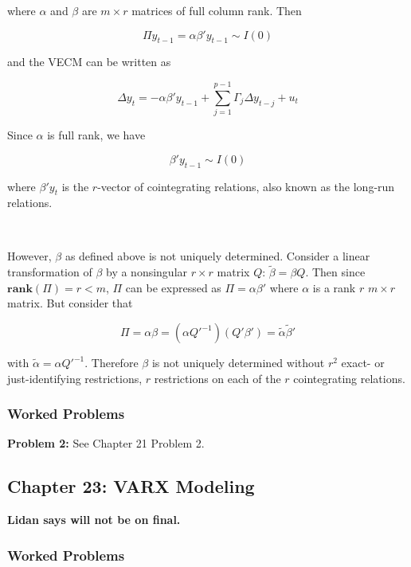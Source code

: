 where \(\alpha\) and \(\beta\) are \(m \times r\) matrices of full column rank. Then

\[
\Pi y_{t-1} = \alpha \beta' y_{t-1} \sim I(0)
\]

and the VECM can be written as

\begin{equation}\label{ts.eq.22.19}
\Delta y_{t} = -\alpha \beta' y_{t-1} + \sum_{j=1}^{p-1} \Gamma_j \Delta y_{t-j} + u_t
\end{equation}

Since \(\alpha\) is full rank, we have

\[
\beta' y_{t-1} \sim I(0)
\]

where \(\beta'y_t\) is the \(r\)-vector of cointegrating relations, also known as the long-run relations.

\

However, \(\beta\) as defined above is not uniquely determined. Consider a linear transformation of \(\beta\) by a nonsingular \(r \times r\) matrix \(Q\): \(\tilde{\beta} = \beta Q\). Then since \(\textbf{rank}(\Pi) = r < m\), \(\Pi\) can be expressed as \(\Pi = \alpha \beta'\) where \(\alpha\) is a rank \(r\) \(m \times r\) matrix. But consider that 

\[
\Pi = \alpha \beta = (\alpha {Q'}^{-1})(Q' \beta') = \tilde{\alpha} \tilde{\beta}'
\]

with \(\tilde{\alpha} = \alpha {Q'}^{-1}\). Therefore \(\beta\) is not uniquely determined without \(r^2\) exact- or just-identifying restrictions, \(r\) restrictions on each of the \(r\) cointegrating relations. 

\subsubsection{Worked Problems}

\textbf{Problem 2:} See Chapter 21 Problem 2.

%
%
%
%
%
%

\subsection{Chapter 23: VARX Modeling}

\textbf{Lidan says will not be on final.}

\subsubsection{Worked Problems}

